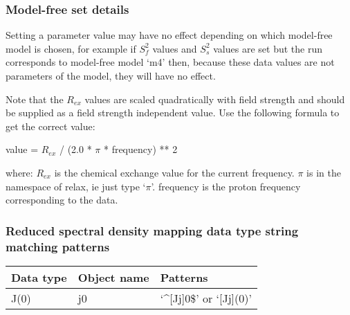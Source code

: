 \subsubsection{Model-free set details}

Setting a parameter value may have no effect depending on which model-free model is chosen,
for example if $S^2_f$ values and $S^2_s$ values are set but the run corresponds to model-free model
`m4' then, because these data values are not parameters of the model, they will have no
effect.

Note that the $R_{ex}$ values are scaled quadratically with field strength and should be supplied
as a field strength independent value.  Use the following formula to get the correct value:

    value = $R_{ex}$ / (2.0 * $\pi$ * frequency) ** 2

where:
    $R_{ex}$ is the chemical exchange value for the current frequency.
    $\pi$ is in the namespace of relax, ie just type `$\pi$'.
    frequency is the proton frequency corresponding to the data.



\subsubsection{Reduced spectral density mapping data type string matching patterns}



\begin{center}
\begin{tabular}{lll}
\toprule
Data type & Object name & Patterns \\
\midrule
 J(0)                    &  j0            &  `\^{}[Jj]0\$' or `[Jj](0)'                            \\
\bottomrule
\end{tabular}
\end{center}

